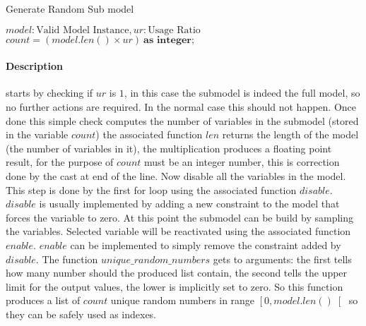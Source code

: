 \begin{algorithm}[H]
    \caption[Generate Random Sub model]{Generate Random Sub model\footnotemark}\label{algo:submodel-build}
    
    \begin{algorithmic}[1]
        \REQUIRE $model : \text{Valid Model Instance}, ur : \text{Usage Ratio}$
            \RETURN
        \ENDIF
        \STATE $count = (model.len() \times ur)\ \textbf{as integer};$
            
        \ENDFOR
        \ENDFOR
    \end{algorithmic}
\end{algorithm}



\paragraph*{Description}
     starts by checking if $ur$ is $1$, in this case the submodel is indeed the full model,
    so no further actions are required. In the normal case this should not 
    happen. Once done this simple check  computes the number of
    variables in the submodel (stored in the variable $count$)  the associated function 
    $len$ returns the length of the model (the number of variables in it), the multiplication produces a floating point result, for the purpose of 
    $count$ must be an integer number, this is correction done by the cast at end of the line. Now  disable all the variables in the model. This step is
    done by the first for loop using the associated function $disable$. $disable$ is usually implemented by adding a new constraint to the model that
    forces the variable to zero. At this point the submodel can be build by sampling the variables. Selected variable will be reactivated using the associated function
    $enable$. $enable$ can be implemented to simply remove the constraint added by $disable$.
    The function $unique\_random\_numbers$ gets to arguments: the first tells how many number should the produced list contain, the second tells the upper limit for the output values,
    the lower is implicitly set to zero. So this function 
    produces a list of $count$ unique random numbers in range $\left[0, model.len()\right[$ so they can be safely used as indexes. 

